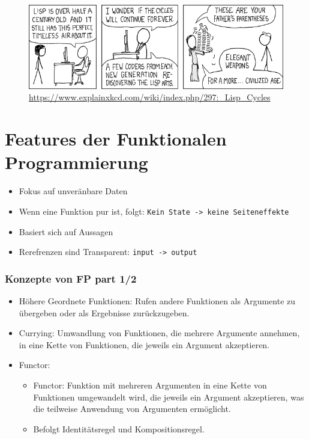 \documentclass{beamer}
\def\code#1{\texttt{#1}}
\begin{document}
\begin{frame}
	\begin{figure}
	    \centering
	    \includegraphics[width=1\linewidth]{bilder/lisp_cycles.png}
        \textmd{ \tiny \url{https://www.explainxkcd.com/wiki/index.php/297:_Lisp_Cycles}}
	\end{figure}
\end{frame}

\section{Features der Funktionalen Programmierung}
\begin{frame}
	\begin{itemize}
		\item Fokus auf unveränbare Daten
            \item Wenn eine Funktion pur ist, folgt: \code{Kein State -> keine Seiteneffekte}
            \item Basiert sich auf Aussagen
            \item Rerefrenzen sind Transparent:   \code{input -> output}
	\end{itemize}
\end{frame}

\begin{frame}
\frametitle{Konzepte  von FP part 1/2} 
	\begin{itemize}
		\item Höhere Geordnete Funktionen: Rufen andere Funktionen als Argumente zu übergeben oder als Ergebnisse zurückzugeben.
			\item Currying: Umwandlung von Funktionen, die mehrere Argumente annehmen, in eine Kette von Funktionen, die jeweils ein Argument akzeptieren.
			\item Functor: \begin{itemize}
			    \item Functor: Funktion mit mehreren Argumenten in eine Kette von Funktionen umgewandelt wird, die jeweils ein Argument akzeptieren, was die teilweise Anwendung von Argumenten ermöglicht.
                    \item  Befolgt Identitätsregel und Kompositionsregel.
			\end{itemize}
	\end{itemize}
\end{frame}
\end{document}
